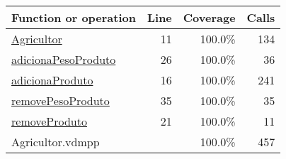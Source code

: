 \begin{longtable}{|l|r|r|r|}
\hline
Function or operation & Line & Coverage & Calls \\
\hline
\hline
\hyperref[Agricultor:11]{Agricultor} & 11&100.0\% & 134 \\
\hline
\hyperref[adicionaPesoProduto:26]{adicionaPesoProduto} & 26&100.0\% & 36 \\
\hline
\hyperref[adicionaProduto:16]{adicionaProduto} & 16&100.0\% & 241 \\
\hline
\hyperref[removePesoProduto:35]{removePesoProduto} & 35&100.0\% & 35 \\
\hline
\hyperref[removeProduto:21]{removeProduto} & 21&100.0\% & 11 \\
\hline
\hline
Agricultor.vdmpp & & 100.0\% & 457 \\
\hline
\end{longtable}


